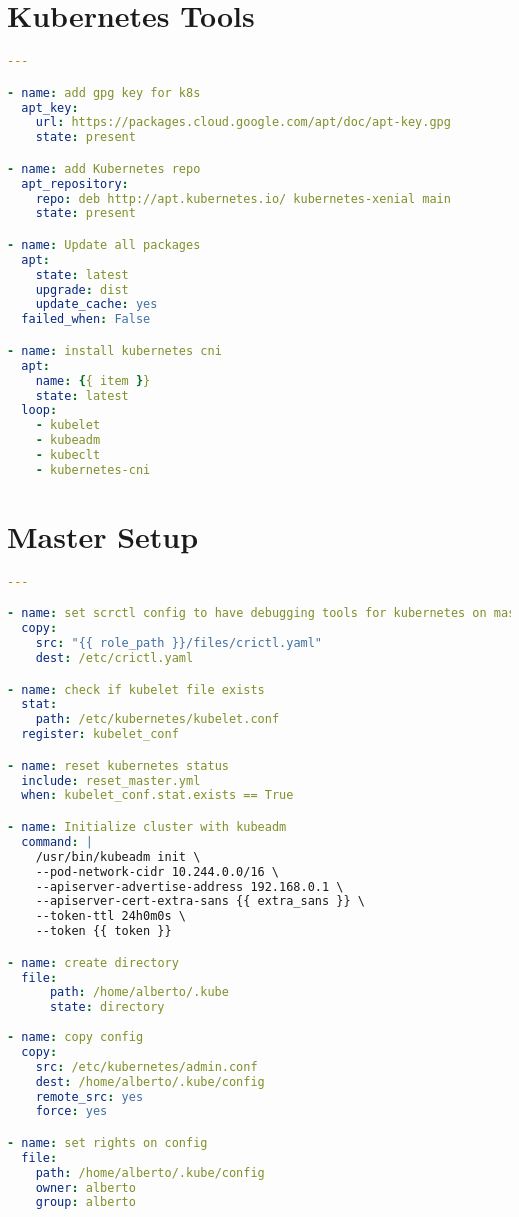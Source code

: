 \section{Kubernetes Tools}
\label{app:kube_tools}
\begin{lstlisting}[language=yaml, caption={tools role}]
---

- name: add gpg key for k8s
  apt_key:
    url: https://packages.cloud.google.com/apt/doc/apt-key.gpg
    state: present

- name: add Kubernetes repo
  apt_repository:
    repo: deb http://apt.kubernetes.io/ kubernetes-xenial main
    state: present

- name: Update all packages
  apt:
    state: latest
    upgrade: dist
    update_cache: yes
  failed_when: False

- name: install kubernetes cni
  apt:
    name: {{ item }}
    state: latest
  loop: 
    - kubelet
    - kubeadm
    - kubeclt
    - kubernetes-cni
\end{lstlisting}

\section{Master Setup}
\label{app:master_setup}
\begin{lstlisting}[language=yaml, caption={master role}]
---

- name: set scrctl config to have debugging tools for kubernetes on master
  copy:
    src: "{{ role_path }}/files/crictl.yaml"
    dest: /etc/crictl.yaml

- name: check if kubelet file exists
  stat: 
    path: /etc/kubernetes/kubelet.conf
  register: kubelet_conf

- name: reset kubernetes status
  include: reset_master.yml
  when: kubelet_conf.stat.exists == True

- name: Initialize cluster with kubeadm
  command: |
    /usr/bin/kubeadm init \
    --pod-network-cidr 10.244.0.0/16 \
    --apiserver-advertise-address 192.168.0.1 \
    --apiserver-cert-extra-sans {{ extra_sans }} \
    --token-ttl 24h0m0s \
    --token {{ token }}

- name: create directory
  file:
      path: /home/alberto/.kube 
      state: directory 
    
- name: copy config
  copy:
    src: /etc/kubernetes/admin.conf
    dest: /home/alberto/.kube/config
    remote_src: yes
    force: yes

- name: set rights on config
  file:
    path: /home/alberto/.kube/config
    owner: alberto
    group: alberto
\end{lstlisting}

